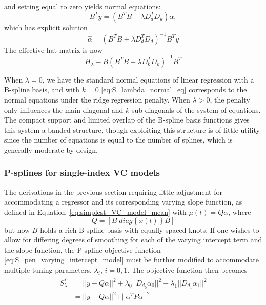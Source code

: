 \documentclass[12pt]{article}
\theoremstyle{definition}
\begin{document}
and setting equal to zero yields normal equations:
\begin{equation}\label{eq:S_lambda_normal_eq}
B^T y = \left(B^T B +  \lambda D_d^TD_k\right)\alpha,
\end{equation}
which has explicit solution
\[
\hat{\alpha} = \left(B^T B +  \lambda D_d^TD_d\right)^{-1}B^T y
\]
\noindent
The effective hat matrix is now
\[
H_\lambda - B\left(B^T B +  \lambda D_k^TD_k\right)^{-1}B^T 
\]

When $\lambda = 0$, we have the standard normal equations of linear regression with a B-spline basis, and with $k = 0$ \ref{eq:S_lambda_normal_eq} corresponds to the normal equations under the ridge regression penalty. When $\lambda > 0$, the penalty only influences the main diagonal and $k$ sub-diagonals of the system of equations. The compact support and limited overlap of the B-spline basis functions gives this system a banded structure, though exploiting this structure is of little utility since the number of equations is equal to the number of splines, which is generally moderate by design. 



\subsubsection{P-splines for single-index VC models}

The derivations in the previous section requiring little adjustment for accommodating a regressor and its corresponding varying slope function, as defined in Equation~\ref{eq:simplest_VC_model_mean} with $\mu\left(t\right) =  Q\alpha$, where 
\[
Q = \left[B | diag\left\{x\left(t\right) \right\}B \right]
\]
but now $B$ holds a rich B-spline basis with equally-spaced knots. If one wishes to allow for differing degrees of smoothing for each of the varying intercept term and the slope function, the P-spline objective function \ref{eq:S_pen_varying_intercept_model} must be further modified to accommodate multiple tuning parameters, $\lambda_i$, $i=0,1$. The objective function then becomes
\begin{align} 
\begin{split}
S^*_\lambda &= \vert \vert y- Q\alpha  \vert \vert^2  + \lambda_0 \vert \vert D_{d_0} \alpha_0 \vert \vert^2 + \lambda_1 \vert \vert D_{d_1} \alpha_1 \vert \vert^2\\
	&= \vert \vert y- Q\alpha  \vert \vert^2  + \vert \vert \alpha^T P \alpha \vert \vert^2
\end{split} \label{eq:S_pen_star}
\end{align}
\end{document}
